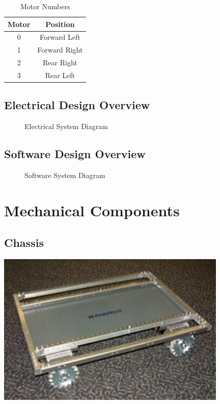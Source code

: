 \documentclass[letterpaper,12pt]{article}
\begin{document}
\begin{table}[h!]
  \centering
  \begin{tabular}{| c | c |}
    \hline
    \textbf{Motor} & \textbf{Position} \\
    \hline
    0 & Forward Left \\
    \hline
    1 & Forward Right \\
    \hline
    2 & Rear Right \\
    \hline
    3 & Rear Left \\
    \hline
  \end{tabular}
  \caption{Motor Numbers}
  \label{tab:motor_nums}
\end{table}

\subsection{Electrical Design Overview}
\begin{figure}[h!]
  \centering
  
  \caption{Electrical System Diagram}
  \label{fig:e_system}
\end{figure}

\subsection{Software Design Overview}
\begin{figure}[h!]
  \centering
  
  \caption{Software System Diagram}
  \label{fig:system_diagram}
\end{figure}

\section{Mechanical Components}
\subsection{Chassis}
\begin{center}
    \includegraphics[width=11cm]{pics/chassis/andymark_chassis.jpg}
\end{center}
\end{document}

